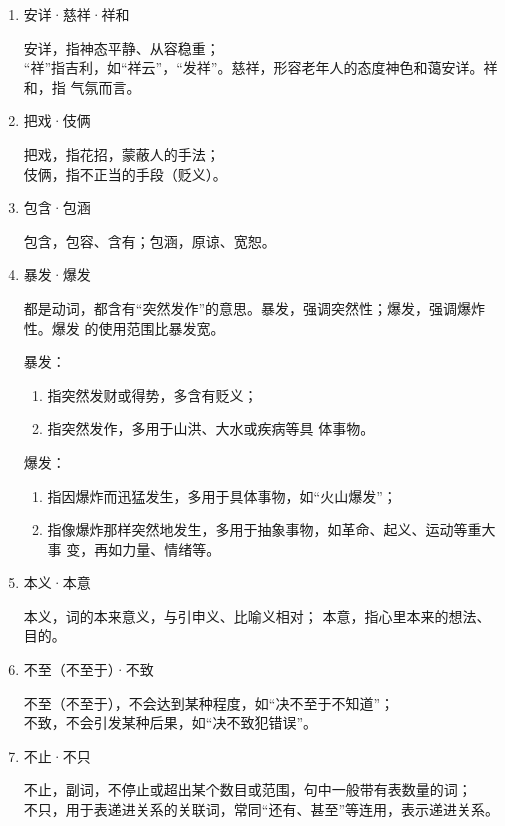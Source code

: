 \documentclass[final,oneside]{ctexbook}
\begin{document}
\begin{enumerate}
  \item 安详·慈祥·祥和

    安详，指神态平静、从容稳重；\\
    “祥”指吉利，如“祥云”，“发祥”。慈祥，形容老年人的态度神色和蔼安详。祥和，指
    气氛而言。

  \item 把戏·伎俩

    把戏，指花招，蒙蔽人的手法；\\
    伎俩，指不正当的手段（贬义）。

  \item 包含·包涵

    包含，包容、含有；包涵，原谅、宽恕。

  \item 暴发·爆发

    都是动词，都含有“突然发作”的意思。暴发，强调突然性；爆发，强调爆炸性。爆发
    的使用范围比暴发宽。

    暴发：

    \begin{enumerate}
      \item 指突然发财或得势，多含有贬义；
      \item 指突然发作，多用于山洪、大水或疾病等具
        体事物。
    \end{enumerate}

    爆发：
    \begin{enumerate}
      \item 指因爆炸而迅猛发生，多用于具体事物，如“火山爆发”；
      \item 指像爆炸那样突然地发生，多用于抽象事物，如革命、起义、运动等重大事
        变，再如力量、情绪等。
    \end{enumerate}

  \item 本义·本意

    本义，词的本来意义，与引申义、比喻义相对；
    本意，指心里本来的想法、目的。

  \item 不至（不至于）·不致

    不至（不至于），不会达到某种程度，如“决不至于不知道”；\\
    不致，不会引发某种后果，如“决不致犯错误”。

  \item 不止·不只

    不止，副词，不停止或超出某个数目或范围，句中一般带有表数量的词；\\
    不只，用于表递进关系的关联词，常同“还有、甚至”等连用，表示递进关系。


\end{enumerate}
\end{document}

